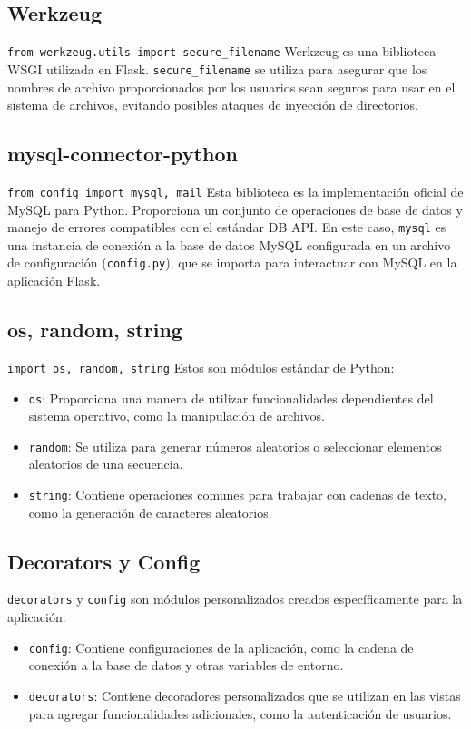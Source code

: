 \documentclass[a4paper, 12pt]{book}
\begin{document}
\subsection{Werkzeug}
\texttt{from werkzeug.utils import secure\_filename} Werkzeug es una biblioteca WSGI utilizada en Flask. \texttt{secure\_filename} se utiliza para asegurar que los nombres de archivo proporcionados por los usuarios sean seguros para usar en el sistema de archivos, evitando posibles ataques de inyección de directorios.

\subsection{mysql-connector-python}
\texttt{from config import mysql, mail} Esta biblioteca es la implementación oficial de MySQL para Python. Proporciona un conjunto de operaciones de base de datos y manejo de errores compatibles con el estándar DB API. En este caso, \texttt{mysql} es una instancia de conexión a la base de datos MySQL configurada en un archivo de configuración (\texttt{config.py}), que se importa para interactuar con MySQL en la aplicación Flask.

\subsection{os, random, string}
\texttt{import os, random, string} Estos son módulos estándar de Python:
\begin{itemize}
  \item \texttt{os}: Proporciona una manera de utilizar funcionalidades dependientes del sistema operativo, como la manipulación de archivos.
  \item \texttt{random}: Se utiliza para generar números aleatorios o seleccionar elementos aleatorios de una secuencia.
  \item \texttt{string}: Contiene operaciones comunes para trabajar con cadenas de texto, como la generación de caracteres aleatorios.
\end{itemize}

\subsection{Decorators y Config}
\texttt{decorators} y \texttt{config} son módulos personalizados creados específicamente para la aplicación. 
\begin{itemize}
  \item \texttt{config}: Contiene configuraciones de la aplicación, como la cadena de conexión a la base de datos y otras variables de entorno.
  \item \texttt{decorators}: Contiene decoradores personalizados que se utilizan en las vistas para agregar funcionalidades adicionales, como la autenticación de usuarios.
\end{itemize}
\end{document}
